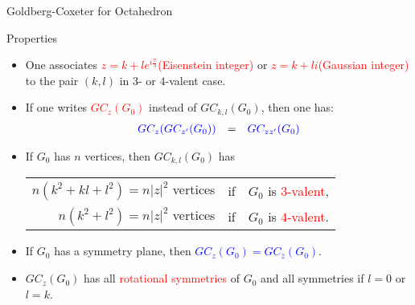 \documentclass[%
pdf,
colorBG,
slideColor,
]{prosper}
\begin{document}
\begin{slide}{Goldberg-Coxeter for Octahedron}
\vspace{-4mm}
\begin{center}
\begin{minipage}{4.0cm}
\centering
{}
\end{minipage}
\begin{minipage}{4.0cm}
\centering
{}
\end{minipage}
\begin{minipage}{4.0cm}
\centering
{}
\end{minipage}
\begin{minipage}{4.0cm}
\centering
{}
\end{minipage}
\end{center}
\end{slide}








\begin{slide}{Properties}
\vspace{-3mm}
\begin{itemize}
\item One associates \textcolor{red}{$z=k+le^{i\frac{\pi}{3}}$(Eisenstein integer)} or \textcolor{red}{$z=k+li$(Gaussian integer)} to the pair $(k,l)$ in $3$- or $4$-valent case.

\item If one writes \textcolor{red}{$GC_{z}(G_0)$} instead of $GC_{k,l}(G_0)$, then one has:
\begin{equation*}
\begin{array}{rcl}
\textcolor{blue}{GC_{z}(GC_{z'}(G_0))}  &=&\textcolor{blue}{GC_{zz'}(G_0)}
\end{array}
\end{equation*}

\item If $G_0$ has $n$ vertices, then $GC_{k,l}(G_0)$ has 
\begin{center}
\begin{tabular}{rcl}
$n(k^2+kl+l^2)=n|z|^2$ vertices &if& $G_0$ is \textcolor{red}{$3$-valent},\\
$n(k^2+l^2)=n|z|^2$ vertices &if& $G_0$ is \textcolor{red}{$4$-valent}.
\end{tabular}
\end{center}
\item If $G_0$ has a symmetry plane, then \textcolor{blue}{$GC_{z}(G_0)=GC_{\overline{z}}(G_0)$}.
\item $GC_{z}(G_0)$ has all \textcolor{red}{rotational symmetries} of $G_0$ and all symmetries if $l=0$ or $l=k$.
\end{itemize}

\end{slide}
\end{document}
